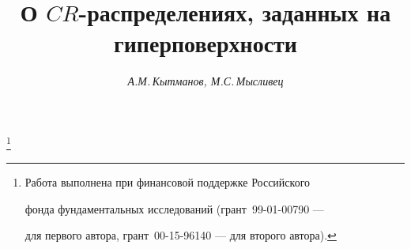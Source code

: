 

 


% 


\newcommand{\la}{\langle} 


\newcommand{\ra}{\rangle} 


\newcommand{\grad}{\operatorname{grad}} 


\newcommand{\supp}{\operatorname{supp}} 


\newcommand{\tts}[1]{} 


 




\setcounter{page}{47} 












 


\author{\it А.М.\,Кытманов, М.С.\,Мысливец} 




\title{О $CR$-распределениях, заданных на гиперповерхности} 


\thanks{Работа выполнена при финансовой поддержке Российского 


фонда фундаментальных исследований (грант \No\,99-01-00790 --- 


для первого автора, грант \No\,00-15-96140 --- для второго автора).} 


 


\date{} 




\pagestyle{plain} %


 


